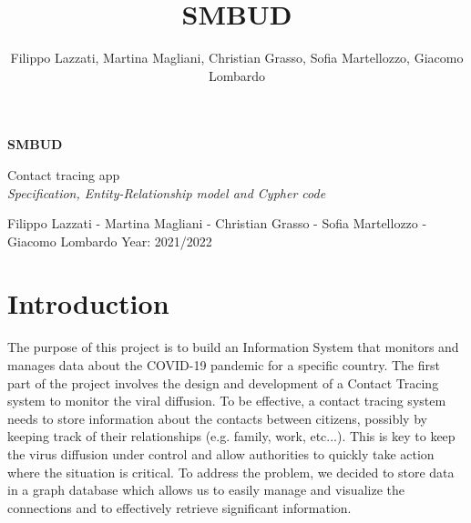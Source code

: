 \documentclass{article}
\title{SMBUD}
\author{Filippo Lazzati, Martina Magliani, Christian Grasso, Sofia Martellozzo, Giacomo Lombardo}
\begin{document}
\thispagestyle{empty} 
\begin{titlepage}
    \begin{center}
       \vspace*{2cm}
       {\Huge \textbf{SMBUD}} %
       \vspace{0.5cm}
       \\
    \begin{LARGE}
        {Contact tracing app}
        \vspace{1.5cm}
        \\
        {\textit{Specification, Entity-Relationship model and Cypher code}}
       \vspace{8cm}
        
        {Filippo Lazzati - Martina Magliani - Christian Grasso - Sofia Martellozzo - Giacomo Lombardo}
       \vspace{0.5cm}
       {Year: 2021/2022}
       
    \end{LARGE}  
   \end{center}
\end{titlepage}
\newpage
\tableofcontents %
\newpage
\section{Introduction}
The purpose of this project is to build an Information System that monitors and manages data about the COVID-19 pandemic for a specific country.
The first part of the project involves the design and development of a Contact Tracing system to monitor the viral diffusion. To be effective, a contact tracing system needs to store information about the contacts between citizens, possibly by keeping track of their relationships (e.g. family, work, etc...). This is key to keep the virus diffusion under control and allow authorities to quickly take action where the situation is critical.
To address the problem, we decided to store data in a graph database which allows us to easily manage and visualize the connections and to effectively retrieve significant information.
\end{document}
